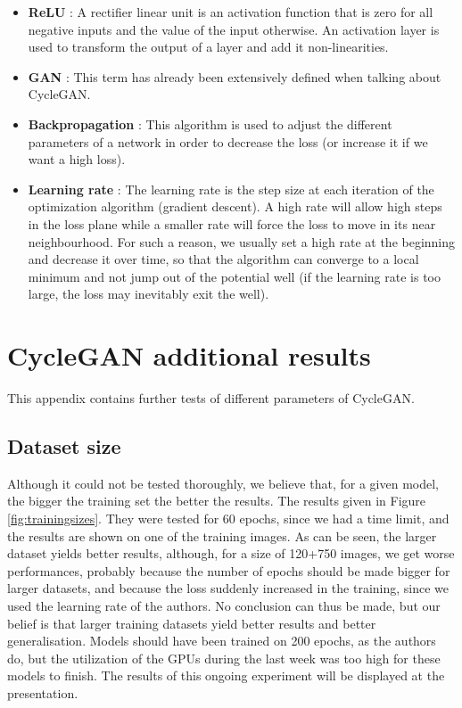 \documentclass[twocolumn,superscriptaddress,aps,floatfix, nofootinbib]{revtex4-1}
\begin{document}
\begin{itemize}
        \item \textbf{ReLU} : A rectifier linear unit is an activation function that is zero for all negative inputs and the value of the input otherwise. An activation layer is used to transform the output of a layer and add it non-linearities.
        
        \item \textbf{GAN} : This term has already been extensively defined when talking about CycleGAN.
        
        \item \textbf{Backpropagation} : This algorithm is used to adjust the different parameters of a network in order to decrease the loss (or increase it if we want a high loss).
        
        \item \textbf{Learning rate} : The learning rate is the step size at each iteration of the optimization algorithm (gradient descent). A high rate will allow high steps in the loss plane while a smaller rate will force the loss to move in its near neighbourhood. For such a reason, we usually set a high rate at the beginning and decrease it over time, so that the algorithm can converge to a local minimum and not jump out of the potential well (if the learning rate is too large, the loss may inevitably exit the well).
    \end{itemize}
    
    
    
    \section{CycleGAN additional results}\label{add}
    
    This appendix contains further tests of different parameters of CycleGAN.
    
    \subsection{Dataset size}
    
    Although it could not be tested thoroughly, we believe that, for a given model, the bigger the training set the better the results. The results given in Figure \ref{fig:trainingsizes}. They were tested for 60 epochs, since we had a time limit, and the results are shown on one of the training images. As can be seen, the larger dataset yields better results, although, for a size of 120+750 images, we get worse performances, probably because the number of epochs should be made bigger for larger datasets, and because the loss suddenly increased in the training, since we used the learning rate of the authors. No conclusion can thus be made, but our belief is that larger training datasets yield better results and better generalisation. Models should have been trained on 200 epochs, as the authors do, but the utilization of the GPUs during the last week was too high for these models to finish. The results of this ongoing experiment will be displayed at the presentation.
    
\end{document}

